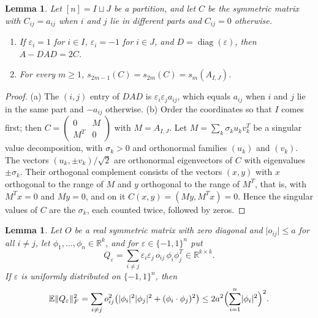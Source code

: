 \documentclass[11pt]{amsart}
\numberwithin{equation}{section}
\newtheorem{lemma}[theorem]{Lemma}
\theoremstyle{definition}
\theoremstyle{remark}
\newcommand{\R}{\mathbb R}
\newcommand{\E}{\mathbb E}
\newcommand{\1}{\mathbf 1}
\DeclareMathOperator{\diag}{diag}
\newcommand{\norm}[1]{\lVert #1\rVert}
\newcommand{\abs}[1]{\lvert #1\rvert}
\begin{document}
\begin{lemma}\label{lem:cross}
Let $[n]=I\sqcup J$ be a partition, and let $C$ be the symmetric matrix with $C_{ij}=a_{ij}$ when $i$ and $j$ lie in different parts and $C_{ij}=0$ otherwise.
\begin{enumerate}
\item[(a)] If $\varepsilon_i=1$ for $i\in I$, $\varepsilon_i=-1$ for $i\in J$, and $D=\diag(\varepsilon)$, then $A-DAD=2C$.
\item[(b)] For every $m\ge1$, $s_{2m-1}(C)=s_{2m}(C)=s_m(A_{I,J})$.
\end{enumerate}
\end{lemma}

\begin{proof}
(a) The $(i,j)$ entry of $DAD$ is $\varepsilon_i\varepsilon_ja_{ij}$, which equals $a_{ij}$ when $i$ and $j$ lie in the same part and $-a_{ij}$ otherwise. (b) Order the coordinates so that $I$ comes first; then $C=\begin{pmatrix}0&M\\M^T&0\end{pmatrix}$ with $M=A_{I,J}$. Let $M=\sum_k\sigma_ku_kv_k^T$ be a singular value decomposition, with $\sigma_k>0$ and orthonormal families $(u_k)$ and $(v_k)$. The vectors $(u_k,\pm v_k)/\sqrt2$ are orthonormal eigenvectors of $C$ with eigenvalues $\pm\sigma_k$. Their orthogonal complement consists of the vectors $(x,y)$ with $x$ orthogonal to the range of $M$ and $y$ orthogonal to the range of $M^T$, that is, with $M^Tx=0$ and $My=0$, and on it $C(x,y)=(My,M^Tx)=0$. Hence the singular values of $C$ are the $\sigma_k$, each counted twice, followed by zeros.
\end{proof}

\begin{lemma}\label{lem:signs}
Let $O$ be a real symmetric matrix with zero diagonal and $\abs{o_{ij}}\le a$ for all $i\ne j$, let $\phi_1,\dots,\phi_n\in\R^k$, and for $\varepsilon\in\{-1,1\}^n$ put
\[
Q_\varepsilon=\sum_{i\ne j}\varepsilon_i\varepsilon_j\,o_{ij}\,\phi_i\phi_j^T\in\R^{k\times k}.
\]
If $\varepsilon$ is uniformly distributed on $\{-1,1\}^n$, then
\[
\E\norm{Q_\varepsilon}_F^2=\sum_{i\ne j}o_{ij}^2\bigl(\abs{\phi_i}^2\abs{\phi_j}^2+(\phi_i\cdot\phi_j)^2\bigr)\le2a^2\Bigl(\sum_{i=1}^n\abs{\phi_i}^2\Bigr)^2 .
\]
\end{lemma}
\end{document}
